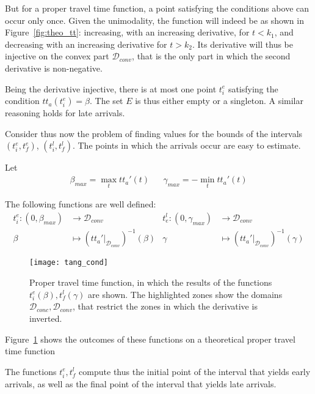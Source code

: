 But for a proper travel time function,
a point satisfying the conditions above can occur only once.
Given the unimodality,
the function will indeed be as shown in Figure~\ref{fig:theo_tt}: increasing, with an increasing derivative,
for \(t < k_1\), and decreasing with an increasing derivative for \(t > k_2\).
Its derivative will thus be injective on the convex part \(\mathcal{D}_{conv}\),
that is the only part in which the second derivative is non-negative.

Being the derivative injective,
there is at most one point \(t_i^e\) satisfying the condition \(tt_a(t_i^e) = \beta\).
The set \(E\) is thus either empty or a singleton.
A similar reasoning holds for late arrivals.

Consider thus now the problem of finding values for the bounds of the intervals \((t_i^e, t_f^e)\), \((t_i^l, t_f^l)\).
The points in which the arrivals occur are easy to estimate.

Let
\begin{align*}
  \beta_{max} = \max_t tt_a'(t) && \gamma_{max} = -\min_t tt_a'(t)
\end{align*}

The following functions are well defined:
\begin{equation}
  \label{eq:def-inv-der}
  \begin{aligned}
    t_i^e: (0, \beta_{max}) & \rightarrow \mathcal{D}_{conv}  & t_e^l: (0, \gamma_{max}) & \rightarrow \mathcal{D}_{conv} \\
    \beta & \mapsto (tt_a' |_{\mathcal{D}_{conv}})^{-1}(\beta) & \gamma & \mapsto(tt_a' |_{\mathcal{D}_{conv}})^{-1}(\gamma)
  \end{aligned}
\end{equation}
\begin{figure}
  \centering
  \texttt{[image: tang\_cond]}
  \caption{
    Proper travel time function,
    in which the results of the functions \(t_i^e(\beta), t_f^l(\gamma)\) are shown.
    The highlighted zones show the domains \(\mathcal{D}_{conc}, \mathcal{D}_{conv}\),
    that restrict the zones in which the derivative is inverted.
}
  \label{fig:tang-cond}
\end{figure}

Figure~\ref{fig:tang-cond} shows the outcomes of these functions on a theoretical proper travel time function

The functions \(t_i^e, t_f^l\) compute thus the initial point of the interval that yields early arrivals,
as well as the final point of the interval that yields late arrivals.


